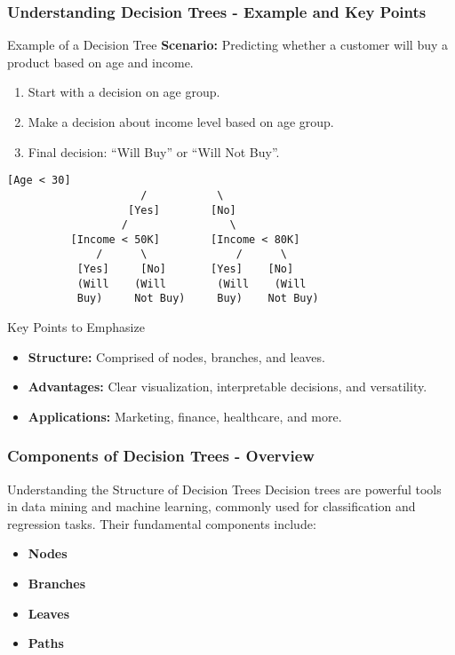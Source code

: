 \documentclass[aspectratio=169]{beamer}
\begin{document}
\begin{frame}[fragile]
    \frametitle{Understanding Decision Trees - Example and Key Points}
    \begin{block}{Example of a Decision Tree}
        \textbf{Scenario:} Predicting whether a customer will buy a product based on age and income.
        \begin{enumerate}
            \item Start with a decision on age group.
            \item Make a decision about income level based on age group.
            \item Final decision: ``Will Buy'' or ``Will Not Buy''.
        \end{enumerate}
        \begin{lstlisting}[basicstyle=\small]
                      [Age < 30]
                     /           \
                   [Yes]        [No]
                  /                \
          [Income < 50K]        [Income < 80K]
              /      \              /      \
           [Yes]     [No]       [Yes]    [No]
           (Will    (Will        (Will    (Will
           Buy)     Not Buy)     Buy)    Not Buy)
        \end{lstlisting}
    \end{block}

    \begin{block}{Key Points to Emphasize}
        \begin{itemize}
            \item \textbf{Structure:} Comprised of nodes, branches, and leaves.
            \item \textbf{Advantages:} Clear visualization, interpretable decisions, and versatility.
            \item \textbf{Applications:} Marketing, finance, healthcare, and more.
        \end{itemize}
    \end{block}
\end{frame}

\begin{frame}[fragile]
  \frametitle{Components of Decision Trees - Overview}
  \begin{block}{Understanding the Structure of Decision Trees}
    Decision trees are powerful tools in data mining and machine learning, commonly used for classification and regression tasks. Their fundamental components include:
  \end{block}
  
  \begin{itemize}
    \item \textbf{Nodes}
    \item \textbf{Branches}
    \item \textbf{Leaves}
    \item \textbf{Paths}
  \end{itemize}
\end{frame}
\end{document}
